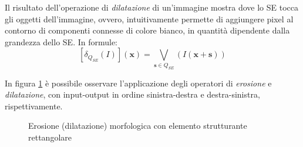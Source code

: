 Il risultato dell'operazione di \textit{dilatazione} di un'immagine mostra dove lo SE tocca gli oggetti dell'immagine, ovvero, intuitivamente permette di aggiungere pixel al contorno di componenti connesse di colore bianco, in quantit\`a dipendente dalla grandezza dello SE. In formule:
\begin{equation}
	\label{eq:dilation}
	[\delta_{Q_{SE}}(I)](\textbf{x}) = \underset{\textbf{s}\in Q_{SE}}{\bigvee}(I(\textbf{x}+\textbf{s}))
\end{equation}\par
In figura \ref{fig:erosion-dilation} \`e possibile osservare l'applicazione degli operatori di \textit{erosione} e \textit{dilatazione}, con input-output in ordine sinistra-destra e destra-sinistra, rispettivamente.
\begin{figure}[h]
	\centering
	\caption{Erosione (dilatazione) morfologica con elemento strutturante rettangolare} \label{fig:erosion-dilation}
\end{figure}


